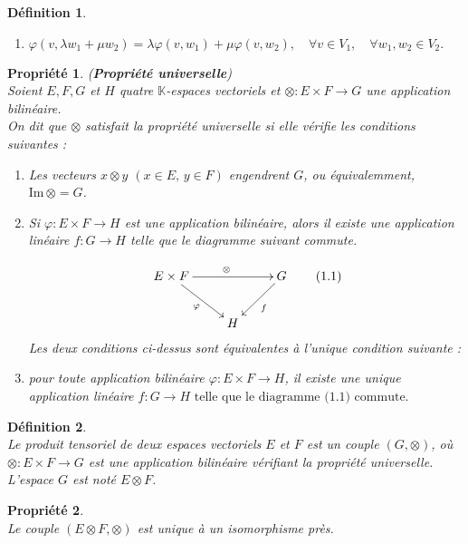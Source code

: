 \documentclass[a4paper, 14pt]{report}
\newtheorem{definition}{Définition}[section]
\newtheorem{propriety}{Propriété}[section]
\begin{document}
\begin{onehalfspace}
{\begin{definition}
\begin{enumerate}[label=\roman*)]
					\item \(\varphi(v, \lambda w_1 + \mu w_2) = \lambda \varphi(v, w_1) + \mu \varphi(v, w_2), \quad \forall v \in V_1, \quad \forall w_1, w_2 \in V_2.\)
				\end{enumerate}
			\end{definition}
			
			\begin{propriety}(\textbf{Propriété universelle}) \cite{greub2012linear}\\
				Soient \( E,F ,G \) et \(H\) quatre \(\mathbb{K}\)-espaces vectoriels et \(\otimes : E \times F \to G \) une application bilinéaire. \\
				On dit que $\otimes$ satisfait la \textit{propriété universelle} si elle vérifie les conditions suivantes :
				\begin{enumerate} [label=\roman*)]
					\item Les vecteurs $x \otimes y$ $(x \in E, \, y \in F)$ engendrent $G$, ou équivalemment, $\mathrm{Im} \, \otimes = G$.
					\item Si \(\varphi : E \times F \to H \) est une application bilinéaire, alors il existe une application linéaire $f : G \to H$ telle que le diagramme suivant commute.
					
					\[
					\xymatrix{
						E \times F \ar[rr]^{\otimes} \ar[dr]_{\varphi} & & G \ar[dl]^{f} \\
						& H &
					}  \quad \quad \text{(1.1)}
					\] 
					Les deux conditions ci-dessus sont équivalentes à l'unique condition suivante :
					\item pour toute application bilinéaire  $\varphi : E \times F \to H$,  il existe une unique application linéaire \(f : G \to H \text{ telle que le diagramme (1.1) commute.}\)
				\end{enumerate}
			\end{propriety}
			
			
			\begin{definition} \cite{greub2012linear}\\
				Le produit tensoriel de deux espaces vectoriels $E$ et $F$ est un couple $(G, \otimes)$, où $\otimes : E \times F \to G$ est une application bilinéaire vérifiant la propriété universelle.\\
				L'espace $G$ est noté $E \otimes F$.
			\end{definition}
			
			\begin{propriety} \cite{greub2012linear}\\
				Le couple \( (E \otimes F, \otimes) \) est unique à un isomorphisme près.
			\end{propriety}
			
}
\end{onehalfspace}
\end{document}
